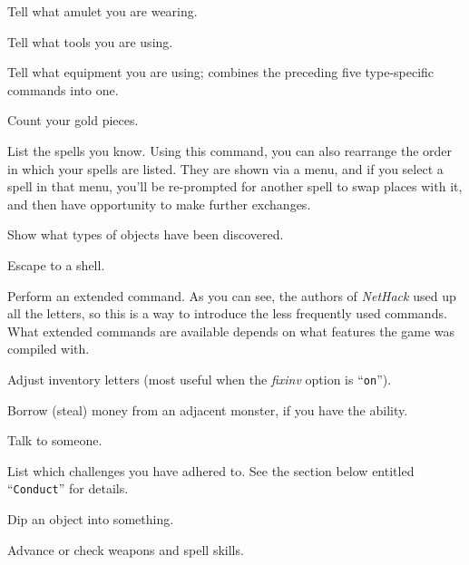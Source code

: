 \item[\tb{"}]
Tell what amulet you are wearing.

\item[\tb{(}]
Tell what tools you are using.

\item[\tb{*}]
Tell what equipment you are using; combines the preceding five type-specific
commands into one.

\item[\tb{\$}]
Count your gold pieces.

\item[\tb{+}]
List the spells you know.  Using this command, you can also rearrange
the order in which your spells are listed.  They are shown via a menu,
and if you select a spell in that menu, you'll be re-prompted for
another spell to swap places with it, and then have opportunity to
make further exchanges.

\item[\tb{$\backslash$}]
Show what types of objects have been discovered.

\item[\tb{!}]
Escape to a shell.

\item[\tb{\#}]
Perform an extended command.  As you can see, the authors of {\it NetHack\/}
used up all the letters, so this is a way to introduce the less frequently
used commands.
What extended commands are available depends on what features the game was
compiled with.

\item[\tb{\#{\rm adjust}}]
Adjust inventory letters (most useful when the
{\it fixinv\/} 
option is ``{\tt on}'').

\item[\tb{\#{\rm borrow}}]
Borrow (steal) money from an adjacent monster, if you have the ability.

\item[\tb{\#{\rm chat}}]
Talk to someone.

\item[\tb{\#{\rm conduct}}]
List which challenges you have adhered to.  See the section below entitled
``{\tt Conduct}'' for details.

\item[\tb{\#{\rm dip}}]
Dip an object into something.

\item[\tb{\#{\rm enhance}}]
Advance or check weapons and spell skills.

